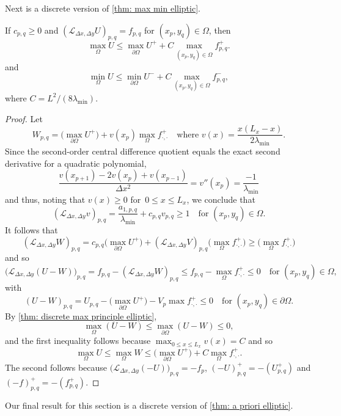 Next is a discrete version of \cref{thm: max min elliptic}.

\begin{theorem}\label{thm: discrete max principle elliptic}
If $c_{p,q}\ge0$ and $(\mathcal{L}_{\Delta x,\Delta y}U)_{p,q}=f_{p,q}$
for $(x_p,y_q)\in\Omega$, then
\[
\max_\Omega U\le\max_{\partial\Omega}U^++C\max_{(x_p,y_q)\in\Omega} f^+_{p,q}.
\]
and
\[
\min_\Omega U\le\min_{\partial\Omega}U^-+C\max_{(x_p,y_q)\in\Omega}f^-_{p,q},
\]
where $C=L^2/(8\lambda_{\min})$.
\end{theorem}
\begin{proof}
Let
\[
W_{p,q}=\bigl(\max_{\partial\Omega}U^+\bigr)
	+v(x_p)\max_\Omega f^+_{\cdot,\cdot}
\quad\text{where $v(x)=\frac{x(L_x-x)}{2\lambda_{\min}}$.}
\]
Since the second-order central difference quotient equals the exact second
derivative for a quadratic polynomial,
\[
\frac{v(x_{p+1})-2v(x_p)+v(x_{p-1})}{\Delta x^2}=v''(x_p)
	=\frac{-1}{\lambda_{\min}}
\]
and thus, noting that $v(x)\ge0$ for~$0\le x\le L_x$, we conclude that
\[
(\mathcal{L}_{\Delta x,\Delta y}v)_{p,q}=\frac{a_{1,p,q}}{\lambda_{\min}}
	+c_{p,q}v_{p,q}\ge1\quad\text{for $(x_p,y_q)\in\Omega$.}
\]
It follows that
\[
(\mathcal{L}_{\Delta x,\Delta y}W)_{p,q}
	=c_{p,q}\bigl(\max_{\partial\Omega}U^+\bigr)
	+(\mathcal{L}_{\Delta x,\Delta y}V)_{p,q}
	\bigl(\max_\Omega f^+_{\cdot,\cdot}\bigr)
	\ge\bigl(\max_\Omega f^+_{\cdot,\cdot}\bigr)
\]
and so
\[
\bigl(\mathcal{L}_{\Delta x,\Delta y}(U-W)\bigr)_{p,q}
	=f_{p,q}-(\mathcal{L}_{\Delta x,\Delta y}W)_{p,q}
	\le f_{p,q}-\max_{\Omega}f^+_{\cdot,\cdot}\le0
\quad\text{for $(x_p,y_q)\in\Omega$,}  
\]
with
\[
(U-W)_{p,q}=U_{p,q}-\bigl(\max_{\partial\Omega}U^+\bigr)
	-V_p\max f^+_{\cdot,\cdot}\le0
\quad\text{for $(x_p,y_q)\in\partial\Omega$.}  
\]
By \cref{thm: discrete max principle elliptic},
\[
\max_\Omega(U-W)\le\max_{\partial\Omega}(U-W)\le0,
\]
and the first inequality follows because $\max_{0\le x\le L_x}v(x)=C$ and so
\[
\max_\Omega U\le\max_\Omega W\le\bigl(\max_{\partial\Omega}U^+\bigr)
	+C\max_\Omega f^+_{\cdot,\cdot}.
\]
The second follows because
$\bigl(\mathcal{L}_{\Delta x,\Delta y}(-U)\bigr)_{p,q}=-f_p$,
$(-U)^+_{p,q}=-(U^+_{p,q})$ and $(-f)^+_{p,q}=-(f^+_{p,q})$.
\end{proof}

Our final result for this section is a discrete version of 
\cref{thm: a priori elliptic}.

